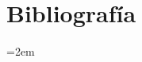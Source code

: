 \documentclass[12pt,twocolumn,letterpaper]{article}
\def\UrlBreaks{\do\/\do\-\do\_\do\.\do\=\do\&\do\?\do\#\do\%}
\begin{document}
\section*{Bibliografía}
\begingroup
\footnotesize
\raggedright
\setlength{\Urlmuskip}{0mu}
\emergencystretch=2em
\def\UrlBreaks{\do\/\do\-\do\_\do\.\do\=\do\&\do\?\do\#\do\%\do\a\do\b\do\c\do\d\do\e\do\f\do\g\do\h\do\i\do\j\do\k\do\l\do\m\do\n\do\o\do\p\do\q\do\r\do\s\do\t\do\u\do\v\do\w\do\x\do\y\do\z}
\setlength{\parindent}{-1.2em}
\setlength{\leftskip}{1.2em}
\setlength{\parskip}{0pt}
\indent
\end{document}
